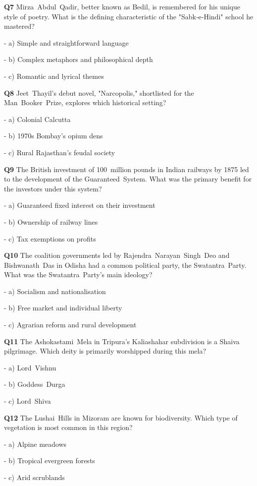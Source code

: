 \textbf{Q7} Mirza Abdul Qadir, better known as Bedil, is remembered for his unique style of poetry. What is the defining characteristic of the "Sabk‑e‑Hindi" school he mastered?\par
\quad - a) Simple and straightforward language\par
\quad - b) Complex metaphors and philosophical depth\par
\quad - c) Romantic and lyrical themes\par

\textbf{Q8} Jeet Thayil's debut novel, "Narcopolis," shortlisted for the Man Booker Prize, explores which historical setting?\par
\quad - a) Colonial Calcutta\par
\quad - b) 1970s Bombay's opium dens\par
\quad - c) Rural Rajasthan's feudal society\par

\textbf{Q9} The British investment of 100 million pounds in Indian railways by 1875 led to the development of the Guaranteed System. What was the primary benefit for the investors under this system?\par
\quad - a) Guaranteed fixed interest on their investment\par
\quad - b) Ownership of railway lines\par
\quad - c) Tax exemptions on profits\par

\textbf{Q10} The coalition governments led by Rajendra Narayan Singh Deo and Bishwanath Das in Odisha had a common political party, the Swatantra Party. What was the Swatantra Party's main ideology?\par
\quad - a) Socialism and nationalisation\par
\quad - b) Free market and individual liberty\par
\quad - c) Agrarian reform and rural development\par

\textbf{Q11} The Ashokastami Mela in Tripura's Kaliashahar subdivision is a Shaiva pilgrimage. Which deity is primarily worshipped during this mela?\par
\quad - a) Lord Vishnu\par
\quad - b) Goddess Durga\par
\quad - c) Lord Shiva\par

\textbf{Q12} The Lushai Hills in Mizoram are known for biodiversity. Which type of vegetation is most common in this region?\par
\quad - a) Alpine meadows\par
\quad - b) Tropical evergreen forests\par
\quad - c) Arid scrublands\par

